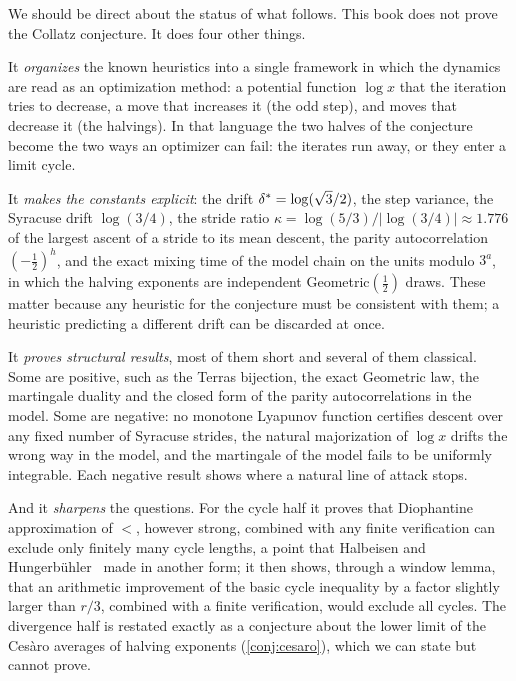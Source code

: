 We should be direct about the status of what follows. This book does not prove
the Collatz conjecture. It does four other things.

It \emph{organizes} the known heuristics into a single framework in which the
dynamics are read as an optimization method: a potential function $\log x$
that the iteration tries to decrease, a move that increases it (the odd step),
and moves that decrease it (the halvings). In that language the two halves of
the conjecture become the two ways an optimizer can fail: the iterates run
away, or they enter a limit cycle.

It \emph{makes the constants explicit}: the drift $\delta^{*}=\log(\sqrt3/2)$, the
step variance, the Syracuse drift $\log(3/4)$, the stride ratio
$\kappa=\log(5/3)/|\log(3/4)|\approx1.776$ of the largest ascent of a stride to its mean descent, the parity autocorrelation $(-\tfrac12)^h$, and the
exact mixing time of the model chain on the units modulo $3^a$, in which the
halving exponents are independent Geometric$(\tfrac12)$ draws.
These matter because any heuristic for the conjecture must be consistent with them; a heuristic predicting a different drift can be discarded at once.

It \emph{proves structural results}, most of them short and several of them
classical. Some are positive, such as the Terras
bijection, the exact Geometric law, the martingale duality and the closed
form of the parity autocorrelations in the model. Some are negative: no
monotone Lyapunov function certifies descent over any fixed number of
Syracuse strides, the
natural majorization of $\log x$ drifts the wrong way in the model, and the
martingale of the model fails to be uniformly integrable. Each negative
result shows where a natural line of attack stops.

And it \emph{sharpens} the questions. For the cycle half it proves that
Diophantine approximation of $\lt$, however strong, combined with any finite
verification can exclude only finitely many cycle lengths, a point that
Halbeisen and Hungerb\"uhler~\cite[\S5]{halbeisen1997} made in another
form; it then shows,
through a window lemma, that an arithmetic improvement of the basic cycle
inequality by a factor slightly larger than $r/3$, combined with a finite verification, would exclude all cycles.
The divergence half is restated exactly as a conjecture about the lower limit of the Ces\`aro averages of halving exponents (\cref{conj:cesaro}), which we can state but cannot prove.

